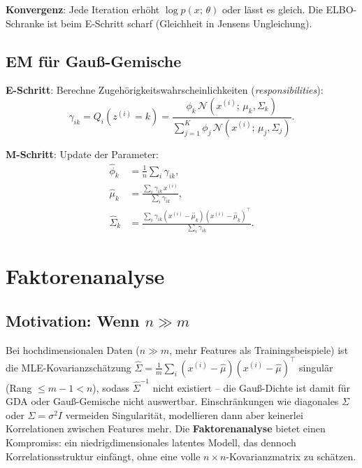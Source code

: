 \documentclass[11pt]{article}
\theoremstyle{csthm}
\theoremstyle{csdef}
\newcommand{\N}{\mathcal{N}}
\newcommand{\T}{^\top}
\begin{document}
\textbf{Konvergenz}: Jede Iteration erhöht $\log p(x;\,\theta)$ oder lässt
es gleich. Die ELBO-Schranke ist beim E-Schritt scharf (Gleichheit in
Jensens Ungleichung).

\subsection{EM für Gauß-Gemische}

\textbf{E-Schritt}: Berechne Zugehörigkeitswahrscheinlichkeiten
(\emph{responsibilities}):
\begin{equation}
  \gamma_{ik} = Q_i(z^{(i)}=k)
  = \frac{\phi_k\,\N(x^{(i)};\,\mu_k,\Sigma_k)}
         {\sum_{j=1}^K \phi_j\,\N(x^{(i)};\,\mu_j,\Sigma_j)}.
\end{equation}

\textbf{M-Schritt}: Update der Parameter:
\begin{align}
  \hat\phi_k &= \frac{1}{n}\sum_i \gamma_{ik}, \\
  \hat\mu_k  &= \frac{\sum_i \gamma_{ik}\, x^{(i)}}{\sum_i \gamma_{ik}}, \\
  \hat\Sigma_k &= \frac{\sum_i \gamma_{ik}(x^{(i)}-\hat\mu_k)(x^{(i)}-\hat\mu_k)\T}
                       {\sum_i \gamma_{ik}}.
\end{align}

\section{Faktorenanalyse}

\subsection{Motivation: Wenn $n \gg m$}

Bei hochdimensionalen Daten ($n \gg m$, mehr Features als Trainingsbeispiele)
ist die MLE-Kovarianzschätzung
$\hat\Sigma = \tfrac1m\sum_i (x^{(i)}-\hat\mu)(x^{(i)}-\hat\mu)\T$ singulär
(Rang $\leq m-1 < n$), sodass $\hat\Sigma^{-1}$ nicht existiert -- die
Gauß-Dichte ist damit für GDA oder Gauß-Gemische nicht auswertbar.
Einschränkungen wie diagonales $\Sigma$ oder $\Sigma=\sigma^2 I$ vermeiden
Singularität, modellieren dann aber keinerlei Korrelationen zwischen
Features mehr. Die \textbf{Faktorenanalyse} bietet einen Kompromiss: ein
niedrigdimensionales latentes Modell, das dennoch Korrelationsstruktur
einfängt, ohne eine volle $n\times n$-Kovarianzmatrix zu schätzen.
\end{document}
